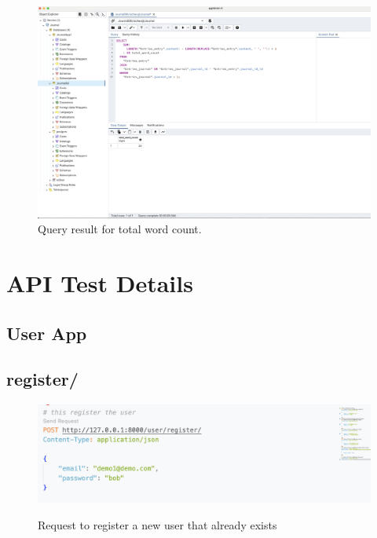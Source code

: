 \begin{figure}[H]
    \includegraphics[width=\textwidth]{Assets/test_total_word_count.png}
    \caption{Query result for total word count.}
    \label{fig:total_word_count}
\end{figure}


\section{API Test Details}

\subsection{User App}
\subsection{register/}
\begin{figure}[H]
    \caption{Request to register a new user that already exists}
    \includegraphics[width=\textwidth]{Assets/api_test/request_register_already_exist.png}
    \label{fig:request_register_already_exist}
\end{figure}

